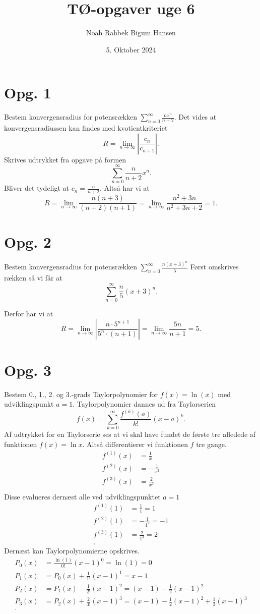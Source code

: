 \documentclass[12pt]{article}
\title{TØ-opgaver uge 6}
\author{Noah Rahbek Bigum Hansen}
\date{5. Oktober 2024}
\begin{document}
\maketitle

\section*{Opg. 1}
Bestem konvergensradius for potensrækken $\sum_{n=0}^{\infty} \frac{nx^n}{n+2}$.
\bigbreak
Det vides at konvergensradiussen kan findes med kvotientkriteriet
\[
R = \lim_{n \to \infty}  \left| \frac{c_n}{c_{n+1}} \right| 
.\] 
Skrives udtrykket fra opgave på formen
\[
\sum_{n=0}^{\infty} \frac{n}{n+2} x^n
.\]
Bliver det tydeligt at $c_n = \frac{n}{n+2}$. Altså har vi at
\[
R = \lim_{n \to \infty} \frac{n(n+3)}{(n+2)(n+1)} = \lim_{n \to \infty} \frac{n^2+3n}{n^2+3n+2} = 1 
.\]

\section*{Opg. 2}
Bestem konvergensradius for potensrækken $\sum_{n=0}^{\infty} \frac{n(x+3)^n}{5}$ 
\bigbreak
Først omskrives rækken så vi får at
\[
\sum_{n=0}^{\infty} \frac{n}{5} (x+3)^n
.\] 

Derfor har vi at
\[
R = \lim_{n \to \infty} \left| \frac{n\cdot 5^{n+1}}{5^n \cdot (n+1)} \right| = \lim_{n \to \infty} \frac{5n}{n+1} = 5 
.\] 


\section*{Opg. 3}
Bestem 0., 1., 2. og 3.-grads Taylorpolynomier for $f(x)=\ln(x)$ med udviklingspunkt $a = 1$.
\bigbreak
Taylorpolynomier dannes ud fra Taylorserien
\[
f(x) = \sum_{k=0}^{\infty} \frac{f^{(k)}(a)}{k!}(x-a)^k
.\]
Af udtrykket for en Taylorserie ses at vi skal have fundet de første tre afledede af funktionen $f(x) = \ln x$. Altså differentierer vi funktionen $f$ tre gange.
\begin{align*}
  f^{(1)}(x) &= \frac{1}{x} \\
  f^{(2)}(x) &= -\frac{1}{x^2} \\
  f^{(3)}(x) &= \frac{2}{x^3} \\
.\end{align*}
Disse evalueres dernæst alle ved udviklingspunktet $a=1$
 \begin{align*}
f^{(1)}(1) &= \frac{1}{1} = 1 \\ 
f^{(2)}(1) &= -\frac{1}{1^2} = -1 \\
f^{(3)}(1) &= \frac{2}{1^3} = 2 \\
 .\end{align*}
Dernæst kan Taylorpolynomierne opskrives.
\begin{align*}
  P_0(x) &= \frac{\ln(1)}{0!}(x-1)^0 = \ln(1) = 0 \\
  P_1(x) &= P_0(x) + \frac{1}{1!}(x-1)^1 = x-1 \\
  P_2(x) &= P_1(x) - \frac{1}{2!}(x-1)^2 = (x-1) - \frac{1}{2}(x-1)^2 \\
  P_3(x) &= P_2(x) + \frac{2}{3!}(x-1)^3 = (x-1) - \frac{1}{2}(x-1)^2 + \frac{1}{3}(x-1)^3 \\
.\end{align*}
\end{document}
